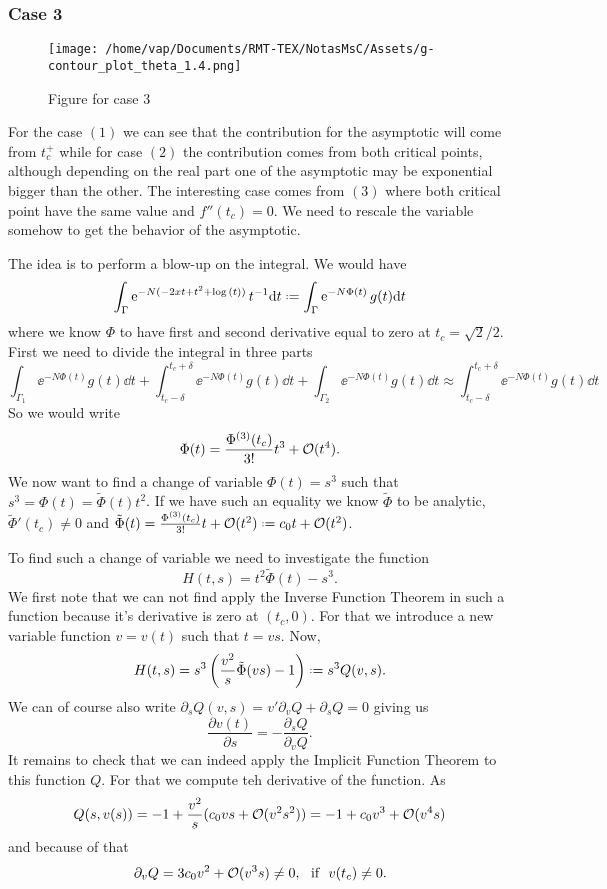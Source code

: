 \subsubsection{Case 3}

\begin{wrapfigure}{h!}{8.5cm}
	\caption{Figure for case 3}\label{wrap-fig:3}
	\texttt{[image: /home/vap/Documents/RMT-TEX/NotasMsC/Assets/g-contour\_plot\_theta\_1.4.png]}
\end{wrapfigure} 

For the case $(1)$ we can see that the contribution for the asymptotic will come from $t_c^+$ while for case $(2)$ the contribution comes from both critical points, although depending on the real part one of the asymptotic may be exponential bigger than the other. The interesting case comes from $(3)$ where both critical point have the same value and $f''(t_c) = 0$. We need to rescale the variable somehow to get the behavior of the asymptotic. 

The idea is to perform a blow-up on the integral. We would have
$$\int_{\Gamma} \ee^{-N(-2 x t + t^2 + \log{(t)})} t^{-1} \dd t \deff \int_{\Gamma} \ee^{-N\Phi(t)} g(t) \dd t $$
where we know $\Phi$ to have first and second derivative equal to zero at $t_c = \sqrt{2}/2$. First we need to divide the integral in three parts
$$ \int_{\Gamma_1} \ee^{-N\Phi(t)} g(t) \dd t + \int_{t_c - \delta}^{t_c + \delta} \ee^{-N\Phi(t)} g(t) \dd t + \int_{\Gamma_2} \ee^{-N\Phi(t)} g(t) \dd t \approx \int_{t_c - \delta}^{t_c + \delta} \ee^{-N\Phi(t)} g(t) \dd t$$
So we would write
$$\Phi(t) = \frac{\Phi^{(3)}(t_c)}{3!} t^3 + \mathcal{O}(t^4).$$
We now want to find a change of variable $\Phi(t) = s^3$ such that $s^3 = \Phi(t) = \tilde{\Phi}(t) t^2$. If we have such an equality we know $\tilde{\Phi}$ to be analytic, $\tilde{\Phi}'(t_c) \neq 0$ and $\tilde{\Phi}(t) = \frac{\Phi^{(3)}(t_c)}{3!} t + \Boh{(  t^2)} \deff c_0 t + \Boh{(t^2)}$. 

To find such a change of variable we need to investigate the function
$$H(t, s) = t^2 \tilde{\Phi}(t) - s^3.$$
We first note that we can not find apply the Inverse Function Theorem in such a function because it's derivative is zero at $(t_c, 0)$. For that we introduce a new variable function $v = v(t)$ such that $t = v s$. Now,
$$ H(t, s) = s^3 \left( \frac{v^2}{s} \tilde{\Phi}(vs) -1 \right) \deff s^3 Q(v, s) .$$
We can of course also write $\partial_s Q(v, s) = v' \partial_v Q + \partial_s Q = 0$ giving us
$$ \frac{\partial v(t)}{\partial s} = - \frac{\partial_s Q}{\partial_v Q}.$$
It remains to check that we can indeed apply the Implicit Function Theorem to this function $Q$. For that we compute teh derivative of the function. As
$$Q(s, v(s)) = -1 + \frac{v^2}{s} (c_0 vs + \mathcal{O}(v^2s^2)) = -1 + c_0v^3 + \mathcal{O}(v^4s)$$
and because of that
$$\partial_v Q = 3 c_0 v^2 + \mathcal{O}{(v^3s)} \neq 0, \ \ \text{if} \ \ v(t_c) \neq 0.$$


